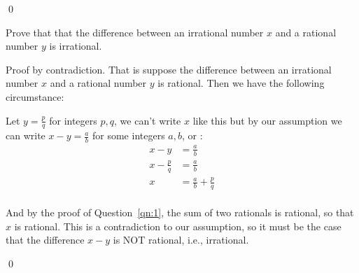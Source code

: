 \documentclass[addpoints]{exam}
\begin{document}
\begin{questions}
\begin{solution}
    \qed
  \end{solution}




  \question[5] Prove that that the difference between an irrational number $x$ and a rational number $y$ is irrational.
  \vspace*{\fill}
  \begin{solution}
    Proof by contradiction. That is suppose the difference between an irrational number $x$ and a rational number $y$ is rational. Then we have the following circumstance:

    Let $y = \frac pq$ for integers $p,q$, we can't write $x$ like this but by our assumption we can write $x-y = \frac ab$ for some integers $a,b$, or :
    \begin{align*}
      x - y &= \frac ab\\
      x - \frac pq &= \frac ab\\
      x &= \frac ab + \frac pq\\
    \end{align*}

    And by the proof of Question~\ref{qn:1}, the sum of two rationals is rational, so that $x$ is rational. This is a contradiction to our assumption, so it must be the case that the difference $x-y$ is NOT rational, i.e., irrational.

    \qed
  \end{solution}


\end{questions}
\end{document}
